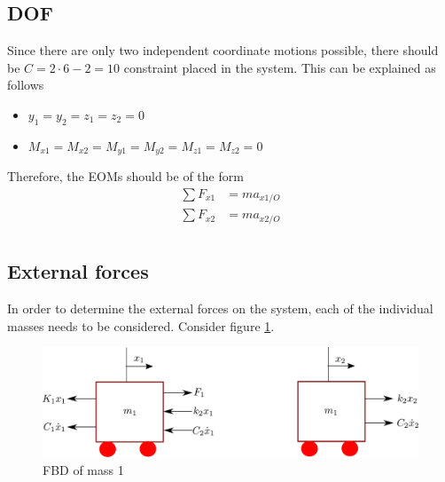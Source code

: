 \subsection{DOF}
Since there are only two independent coordinate motions possible, there should be $C = 2\cdot6 - 2 = 10$ constraint placed in the system. This can be explained as follows
\begin{itemize}
	\item $y_1 = y_2 = z_1 = z_2 = 0$
	\item $M_{x1} = M_{x2} = M_{y1} = M_{y2} = M_{z1} = M_{z2} = 0$
\end{itemize}
Therefore, the EOMs should be of the form
\begin{align}
	\sum F_{x1} &= m a_{x1/O}\\
	\sum F_{x2} &= m a_{x2/O}\\
\end{align}

\subsection{External forces}

In order to determine the external forces on the system, each of the individual masses needs to be considered. Consider figure \ref{fig_0_ch_5_translatingMasses2}.
\begin{figure}[h!]
	\centering
	\includegraphics[width=0.5\linewidth]{Bilder/29_translatingMasses_FBD.pdf}
	\caption{FBD of mass 1}
	\label{fig_0_ch_5_translatingMasses2}
\end{figure}


